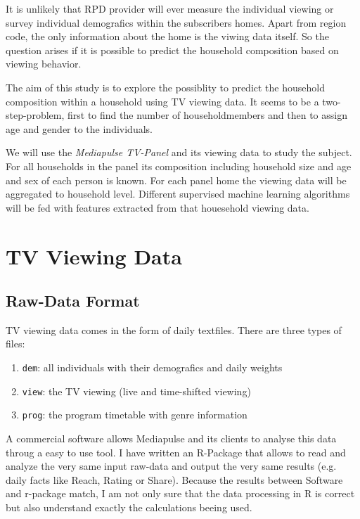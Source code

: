 \documentclass[]{article}
\providecommand{\tightlist}{%
  \setlength{\itemsep}{0pt}\setlength{\parskip}{0pt}}
\begin{document}
It is unlikely that RPD provider will ever measure the individual
viewing or survey individual demografics within the subscribers homes.
Apart from region code, the only information about the home is the
viwing data itself. So the question arises if it is possible to predict
the household composition based on viewing behavior.

The aim of this study is to explore the possiblity to predict the
household composition within a household using TV viewing data. It seems
to be a two-step-problem, first to find the number of householdmembers
and then to assign age and gender to the individuals.

We will use the \emph{Mediapulse TV-Panel} and its viewing data to study
the subject. For all households in the panel its composition including
household size and age and sex of each person is known. For each panel
home the viewing data will be aggregated to household level. Different
supervised machine learning algorithms will be fed with features
extracted from that houesehold viewing data.

\section{TV Viewing Data}\label{tv-viewing-data}

\subsection{Raw-Data Format}\label{raw-data-format}

TV viewing data comes in the form of daily textfiles. There are three
types of files:

\begin{enumerate}
\def\labelenumi{\arabic{enumi}.}
\tightlist
\item
  \texttt{dem}: all individuals with their demografics and daily weights
\item
  \texttt{view}: the TV viewing (live and time-shifted viewing)
\item
  \texttt{prog}: the program timetable with genre information
\end{enumerate}

A commercial software allows Mediapulse and its clients to analyse this
data throug a easy to use tool. I have written an R-Package that allows
to read and analyze the very same input raw-data and output the very
same results (e.g. daily facts like Reach, Rating or Share). Because the
results between Software and r-package match, I am not only sure that
the data processing in R is correct but also understand exactly the
calculations beeing used.
\end{document}
